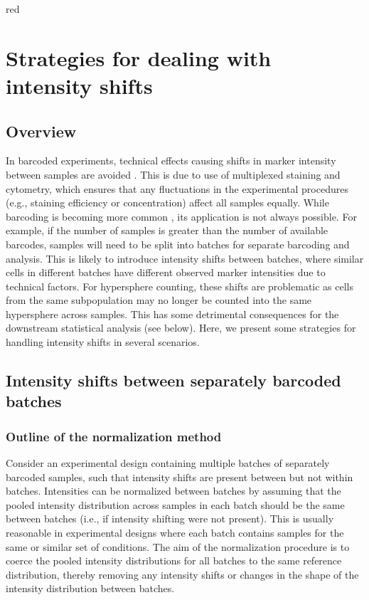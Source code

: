 \documentclass{article}
\begin{document}
\begin{color}{red}
\section{Strategies for dealing with intensity shifts}

\subsection{Overview}
In barcoded experiments, technical effects causing shifts in marker intensity between samples are avoided \cite{zunder2015palladium}.
This is due to use of multiplexed staining and cytometry, which ensures that any fluctuations in the experimental procedures (e.g., staining efficiency or concentration) affect all samples equally.
While barcoding is becoming more common \cite{gaudilliere2014delayed,gaudilliere2015implementing}, its application is not always possible.
For example, if the number of samples is greater than the number of available barcodes, samples will need to be split into batches for separate barcoding and analysis.
This is likely to introduce intensity shifts between batches, where similar cells in different batches have different observed marker intensities due to technical factors.
For hypersphere counting, these shifts are problematic as cells from the same subpopulation may no longer be counted into the same hypersphere across samples.
This has some detrimental consequences for the downstream statistical analysis (see below).
Here, we present some strategies for handling intensity shifts in several scenarios.

\subsection{Intensity shifts between separately barcoded batches}

\subsubsection{Outline of the normalization method}
Consider an experimental design containing multiple batches of separately barcoded samples, such that intensity shifts are present between but not within batches.
Intensities can be normalized between batches by assuming that the pooled intensity distribution across samples in each batch should be the same between batches (i.e., if intensity shifting were not present).
This is usually reasonable in experimental designs where each batch contains samples for the same or similar set of conditions.
The aim of the normalization procedure is to coerce the pooled intensity distributions for all batches to the same reference distribution, thereby removing any intensity shifts or changes in the shape of the intensity distribution between batches.


\end{color}
\end{document}
